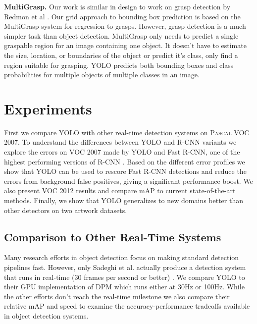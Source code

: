 \documentclass[10pt,twocolumn,letterpaper]{article}
\begin{document}
\textbf{MultiGrasp.} Our work is similar in design to work on grasp detection by Redmon et al \cite{DBLP:journals/corr/RedmonA14}. Our grid approach to bounding box prediction is based on the MultiGrasp system for regression to grasps. However, grasp detection is a much simpler task than object detection. MultiGrasp only needs to predict a single graspable region for an image containing one object. It doesn't have to estimate the size, location, or boundaries of the object or predict it's class, only find a region suitable for grasping. YOLO predicts both bounding boxes and class probabilities for multiple objects of multiple classes in an image.

\section{Experiments}

First we compare YOLO with other real-time detection systems on \textsc{Pascal} VOC 2007. To understand the differences between YOLO and R-CNN variants we explore the errors on VOC 2007 made by YOLO and Fast R-CNN, one of the highest performing versions of R-CNN \cite{DBLP:journals/corr/Girshick15}. Based on the different error profiles we show that YOLO can be used to rescore Fast R-CNN detections and reduce the errors from background false positives, giving a significant performance boost. We also present VOC 2012 results and compare mAP to current state-of-the-art methods. Finally, we show that YOLO generalizes to new domains better than other detectors on two artwork datasets.

\subsection{Comparison to Other Real-Time Systems}

Many research efforts in object detection focus on making standard detection pipelines fast. \cite{dean2013fast} \cite{yan2014fastest} \cite{sadeghi201430hz} \cite{DBLP:journals/corr/Girshick15} \cite{he2014spatial} \cite{ren2015faster} However, only Sadeghi et al. actually produce a detection system that runs in real-time (30 frames per second or better) \cite{sadeghi201430hz}. We compare YOLO to their GPU implementation of DPM which runs either at 30Hz or 100Hz. While the other efforts don't reach the real-time milestone we also compare their relative mAP and speed to examine the accuracy-performance tradeoffs available in object detection systems.
\end{document}
